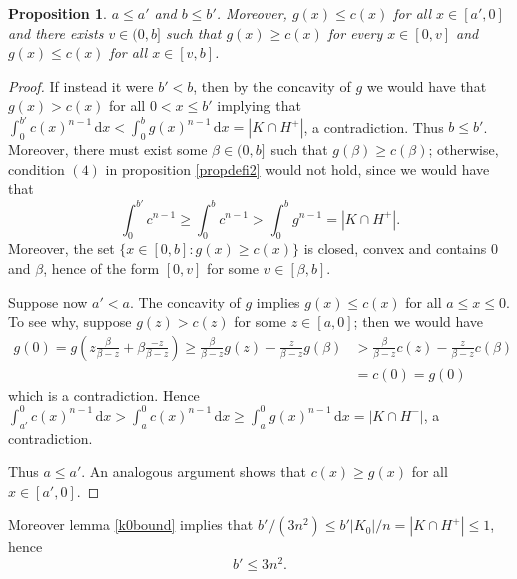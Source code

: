 \documentclass[12pt,reqno]{amsart}
\theoremstyle{plain}
\newtheorem{prop}[teor]{Proposition}
\theoremstyle{definition}
\theoremstyle{remark}
\numberwithin{equation}{section}
\newcommand{\dx}[0]{\,\mathrm{d}x}
\begin{document}
\begin{prop}\label{aborder}
    $a\leq a'$ and $b\leq b'$. Moreover, $g(x)\leq c(x)$ for all $x\in [a',0]$ and there exists $v\in (0,b]$ such that $g(x)\geq c(x)$ for every $x\in [0,v]$ and $g(x)\leq c(x)$ for all $x\in [v,b]$.
\end{prop}

\begin{proof} If instead it were $b'<b$, then by the concavity of $g$ we would have that $g(x)>c(x)$ for all $0<x\leq b'$ implying that $\int_0^{b'}c(x)^{n-1}\dx<\int_0^{b}g(x)^{n-1}\dx=|K\cap H^+|$, a contradiction. Thus $b\leq b'$. Moreover, there must exist some $\beta\in (0,b]$ such that $g(\beta)\geq c(\beta)$; otherwise, condition $(4)$ in proposition \ref{propdefi2} would not hold, since we would have that
$$\int_0^{b'}c^{n-1}\geq \int_0^{b}c^{n-1}>\int_0^{b}g^{n-1}=|K\cap H^+|.
$$Moreover, the set $\{x\in[0,b]:g(x)\geq c(x)\}$ is closed, convex and contains $0$ and $\beta$, hence of the form $[0,v]$ for some $v\in [\beta,b]$.

Suppose now $a'<a$. The concavity of $g$ implies $g(x)\leq c(x)$ for all $a\leq x\leq 0$. To see why, suppose $g(z)>c(z)$ for some $z\in[a,0]$; then we would have \begin{align*}
    g(0)=g\left(z\frac{\beta}{\beta-z}+\beta\frac{-z}{\beta-z}\right)\geq \frac{\beta}{\beta-z}g(z)  -\frac{z}{\beta-z}g(\beta)&>\frac{\beta}{\beta-z}c(z)  -\frac{z}{\beta-z}c(\beta)\\&=c(0)=g(0)
\end{align*} which is a contradiction. Hence $\int_{a'}^0c(x)^{n-1}\dx>\int_{a}^0c(x)^{n-1}\dx\geq \int_{a}^0g(x)^{n-1}\dx=|K\cap H^-|$, a contradiction.

Thus $a\leq a'$. An analogous argument shows that $c(x)\geq g(x)$ for all $x\in [a',0]$.

\end{proof}

Moreover lemma \ref{k0bound} implies that $b'/(3n^2)\leq b'|K_0|/n=|K\cap H^+|\leq 1$, hence
\begin{equation}\label{bprimebound}
    b'\leq 3n^2.
\end{equation}
\end{document}
